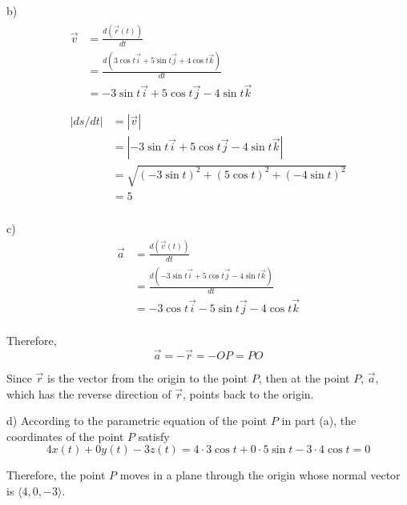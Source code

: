 \documentclass{article}
\begin{document}
b) 
\begin{gather*}
  \begin{split}
    \vec{v} &= \frac{d(\vec{r}(t))}{dt} \\
            &= \frac{d(3 \cos t \vec{i} + 5 \sin t \vec{j} + 4 \cos t \vec{k})}{dt} \\
            &= - 3 \sin t \vec{i} + 5 \cos t \vec{j} - 4 \sin t \vec{k} \\
  \end{split} \\
  \begin{split}
    |ds/dt| &= |\vec{v}| \\
            &= |- 3 \sin t \vec{i} + 5 \cos t \vec{j} - 4 \sin t \vec{k}| \\
            &= \sqrt{(-3 \sin t)^2 + (5 \cos t)^2 + (-4 \sin t)^2} \\
            &= 5 \\
  \end{split}
\end{gather*}

c)
\begin{equation*}
  \begin{split}
    \vec{a} &= \frac{d(\vec{v}(t))}{dt} \\
            &= \frac{d(- 3 \sin t \vec{i} + 5 \cos t \vec{j} - 4 \sin t \vec{k})}{dt} \\
            &= -3 \cos t \vec{i} - 5 \sin t \vec{j} - 4 \cos t \vec{k} \\
  \end{split}
\end{equation*}

Therefore,
\begin{equation*}
  \vec{a} = - \vec{r} = -OP = PO
\end{equation*}

Since $\vec{r}$ is the vector from the origin to the point $P$, then at the 
point $P$, $\vec{a}$, which has the reverse direction of $\vec{r}$, points back 
to the origin.

d) According to the parametric equation of the point $P$ in part (a), the 
coordinates of the point $P$ satisfy
\begin{equation*}
  4 x(t) + 0 y(t) - 3 z(t) = 4 \cdot 3 \cos t + 0 \cdot 5 \sin t - 3 \cdot 4 \cos t = 0
\end{equation*}

Therefore, the point $P$ moves in a plane through the origin whose normal vector is 
$\langle 4, 0, -3 \rangle$.
\end{document}
